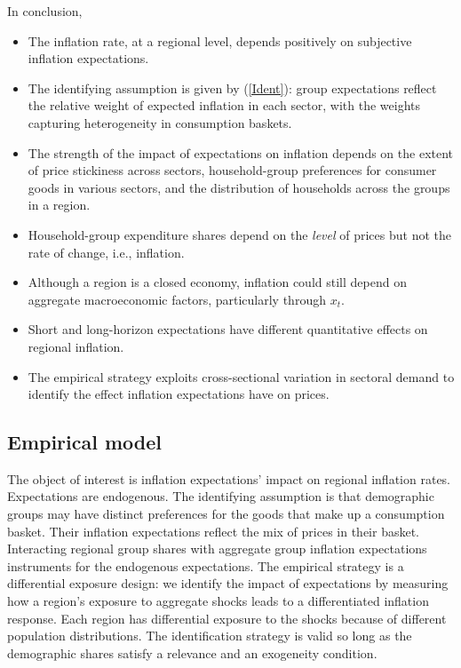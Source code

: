 \documentclass[12pt]{article}
\begin{document}
In conclusion,
\begin{itemize}
\item The inflation rate, at a regional level, depends positively on subjective inflation expectations.
\item The identifying assumption is given by (\ref{Ident}): group expectations reflect the relative weight of expected inflation in each sector, with the weights capturing heterogeneity in consumption baskets.
\item The strength of the impact of expectations on inflation depends on the extent of price stickiness across sectors, household-group preferences for consumer goods in various sectors, and the distribution of households across the groups in a region.
\item Household-group expenditure shares depend on the \emph{level} of prices but not the rate of change, i.e., inflation.
\item Although a region is a closed economy, inflation could still depend on aggregate macroeconomic factors, particularly through $x_t$. 
\item Short and long-horizon expectations have different quantitative effects on regional inflation.
\item The empirical strategy exploits cross-sectional variation in sectoral demand to identify the effect inflation expectations have on prices.
\end{itemize}

\subsection{Empirical model}

The object of interest is inflation expectations' impact on regional inflation rates. Expectations are endogenous. The identifying assumption is that demographic groups may have distinct preferences for the goods that make up a consumption basket. Their inflation expectations reflect the mix of prices in their basket. Interacting regional group shares with aggregate group inflation expectations instruments for the endogenous expectations. The empirical strategy is a differential exposure design: we identify the impact of expectations by measuring how a region's exposure to aggregate shocks leads to a differentiated inflation response. Each region has differential exposure to the shocks because of different population distributions. The identification strategy is valid so long as the demographic shares satisfy a relevance and an exogeneity condition.
\end{document}

